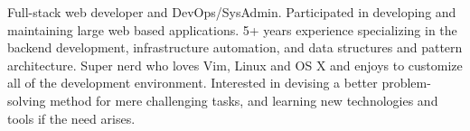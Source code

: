 

\begin{cvparagraph}
Full-stack web developer and DevOps/SysAdmin.
Participated in developing and maintaining large web based applications. 5+ years experience specializing in the backend development, infrastructure automation, and data structures and pattern architecture. Super nerd who loves Vim, Linux and OS X and enjoys to customize all of the development environment. Interested in devising a better problem-solving method for mere challenging tasks, and learning new technologies and tools if the need arises.
\end{cvparagraph}
